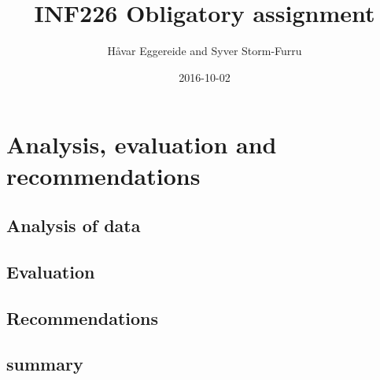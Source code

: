 \documentclass{article} %
\title{INF226 Obligatory assignment}
\date{2016-10-02}
\author{Håvar Eggereide and Syver Storm-Furru}
\begin{document}
\section{Analysis, evaluation and recommendations}  
\subsection{Analysis of data}
\subsection{Evaluation}
\subsection{Recommendations}
\subsection{summary}
\end{document}
